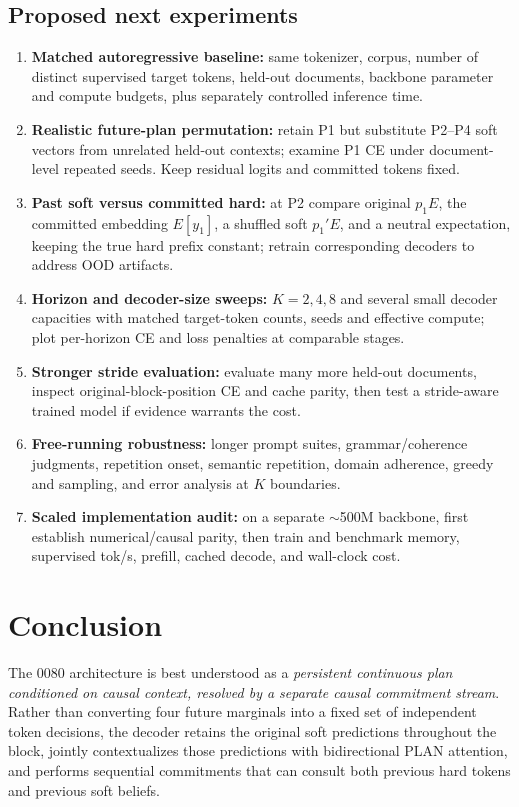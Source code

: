 \documentclass[11pt,letterpaper]{article}
\newcommand{\term}[1]{\textbf{#1}}
\begin{document}
\subsection{Proposed next experiments}
\begin{enumerate}
\item \term{Matched autoregressive baseline:} same tokenizer, corpus, number of distinct supervised target tokens, held-out documents, backbone parameter and compute budgets, plus separately controlled inference time.
\item \term{Realistic future-plan permutation:} retain P1 but substitute P2--P4 soft vectors from unrelated held-out contexts; examine P1 CE under document-level repeated seeds. Keep residual logits and committed tokens fixed.
\item \term{Past soft versus committed hard:} at P2 compare original $p_1E$, the committed embedding $E[y_1]$, a shuffled soft $p_1'E$, and a neutral expectation, keeping the true hard prefix constant; retrain corresponding decoders to address OOD artifacts.
\item \term{Horizon and decoder-size sweeps:} $K=2,4,8$ and several small decoder capacities with matched target-token counts, seeds and effective compute; plot per-horizon CE and loss penalties at comparable stages.
\item \term{Stronger stride evaluation:} evaluate many more held-out documents, inspect original-block-position CE and cache parity, then test a stride-aware trained model if evidence warrants the cost.
\item \term{Free-running robustness:} longer prompt suites, grammar/coherence judgments, repetition onset, semantic repetition, domain adherence, greedy and sampling, and error analysis at $K$ boundaries.
\item \term{Scaled implementation audit:} on a separate $\sim$500M backbone, first establish numerical/causal parity, then train and benchmark memory, supervised tok/s, prefill, cached decode, and wall-clock cost.
\end{enumerate}

\section{Conclusion}
The 0080 architecture is best understood as a \emph{persistent continuous plan conditioned on causal context, resolved by a separate causal commitment stream}. Rather than converting four future marginals into a fixed set of independent token decisions, the decoder retains the original soft predictions throughout the block, jointly contextualizes those predictions with bidirectional PLAN attention, and performs sequential commitments that can consult both previous hard tokens and previous soft beliefs.
\end{document}
